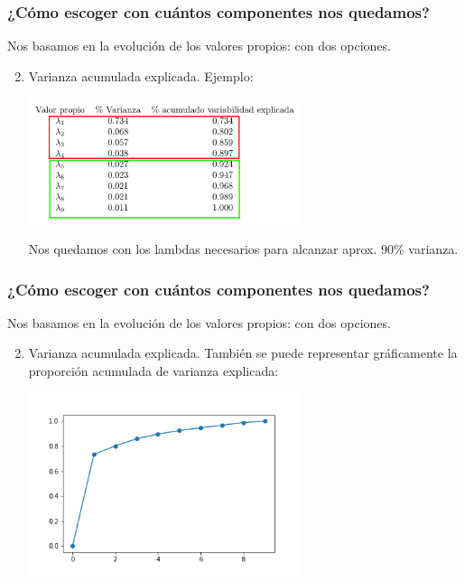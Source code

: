 \documentclass{beamer}
\begin{document}
\begin{frame}\frametitle{¿Cómo escoger con cuántos componentes nos quedamos?}
                \begin{overlayarea}{\textwidth}{8cm} 
  Nos basamos en la evolución de los valores propios: con dos opciones.
  \begin{enumerate}  \setcounter{enumi}{1}
  \item<+-> Varianza acumulada explicada. Ejemplo:
  \begin{center}
    \includegraphics[width=8cm]{tabla-acp2-crop.png}
  \end{center}
 Nos quedamos con los lambdas necesarios para alcanzar aprox. 90\% varianza.
  \end{enumerate}
                \end{overlayarea}
  
\end{frame}
\begin{frame}\frametitle{¿Cómo escoger con cuántos componentes nos quedamos?}
                \begin{overlayarea}{\textwidth}{8cm} 
  Nos basamos en la evolución de los valores propios: con dos opciones.
  \begin{enumerate}  \setcounter{enumi}{1}
  \item Varianza acumulada explicada. También se puede representar
    gráficamente la proporción acumulada de varianza explicada:
  \begin{center}
    \includegraphics[width=8cm]{proporcion_acumulada_acp.png}
  \end{center}

  \end{enumerate}
                \end{overlayarea}
  
              \end{frame}
\end{document}
